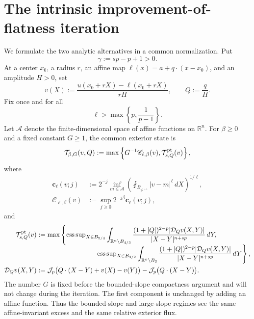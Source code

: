 \documentclass[11pt,reqno]{amsart}
\numberwithin{equation}{section}
\newcommand{\R}{\mathbb R}
\newcommand{\Jp}{\mathcal J_p}
\newcommand{\dd}{\,d}
\theoremstyle{remark}
\begin{document}
\section{The intrinsic improvement-of-flatness iteration}
\label{sec:common-recursion}

We formulate the two analytic alternatives in a common normalization.  Put
\begin{equation*}
 \gamma:=sp-p+1>0.
\end{equation*}
At a center $x_0$, a radius $r$, an affine map
$\ell(x)=a+q\cdot(x-x_0)$, and an amplitude $H>0$, set
\begin{equation}
 v(X):=\frac{u(x_0+rX)-\ell(x_0+rX)}{rH},
 \qquad Q:=\frac qH.
 \label{eq:common-intrinsic-profile}
\end{equation}
Fix once and for all
\begin{equation*}
 \ell>\max\left\{p,\frac1{p-1}\right\}.
\end{equation*}
Let \(\mathcal A\) denote the finite-dimensional space of affine
functions on \(\R^n\).
For \(\beta\ge0\) and a fixed constant \(G\ge1\), the
common exterior state is
\begin{equation}
 \mathcal T_{\beta,G}(v,Q)
 :=\max\left\{G^{-1}\mathscr C_{\ell,\beta}(v),
   \mathcal T^{\rm pt}_{s,Q}(v)\right\},
 \label{eq:common-tail-state}
\end{equation}
where
\begin{align*}
 \mathbf c_\ell(v;j)
 &:=2^{-j}\inf_{m\in\mathcal A}
 \left(\fint_{B_{2^{j+1}}}|v-m|^\ell\dd X\right)^{1/\ell},\\
 \mathscr C_{\ell,\beta}(v)
 &:=\sup_{j\ge0}2^{-j\beta}\mathbf c_\ell(v;j),
\end{align*}
and
\begin{align*}
 \mathcal T^{\rm pt}_{s,Q}(v)
 &:=\max\left\{
 {\operatorname*{ess\,sup}}_{X\in B_{5/4}}
 \int_{\R^n\setminus B_{4/3}}
 \frac{(1+|Q|)^{2-p}|\mathcal D_Qv(X,Y)|}
 {|X-Y|^{n+sp}}\dd Y,\right.\\[-2mm]
 &\hspace{31mm}\left.
 {\operatorname*{ess\,sup}}_{X\in B_{3/2}}
 \int_{\R^n\setminus B_2}
 \frac{(1+|Q|)^{2-p}|\mathcal D_Qv(X,Y)|}
 {|X-Y|^{n+sp}}\dd Y\right\},\\
 \mathcal D_Qv(X,Y)
 &:=\Jp\bigl(Q\cdot(X-Y)+v(X)-v(Y)\bigr)
       -\Jp\bigl(Q\cdot(X-Y)\bigr).
\end{align*}
The number \(G\) is fixed before the bounded-slope compactness
argument and will not change during the iteration.  The first component
is unchanged by adding an affine function.  Thus
the bounded-slope and large-slope regimes see the same affine-invariant
excess and the same relative exterior flux.
\end{document}
